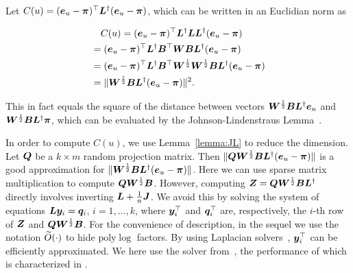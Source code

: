 \documentclass[journal]{IEEEtran}
\begin{document}
Let \(C(u)=(\boldsymbol{e}_u - \boldsymbol{\pi})^{\top} \boldsymbol{L}^{\dagger} (\boldsymbol{e}_u- \boldsymbol{\pi})\), which can be written in an Euclidian norm as
\begin{small}
    \begin{equation}\label{EE12}
        \begin{split}
            &\quad C(u)=(\boldsymbol{e}_u - \boldsymbol{\pi})^{\top} \boldsymbol{L}^{\dagger} \boldsymbol{L} \boldsymbol{L}^{\dagger} (\boldsymbol{e}_u - \boldsymbol{\pi}) \\
            &=(\boldsymbol{e}_u - \boldsymbol{\pi})^{\top} \boldsymbol{L}^{\dagger} \boldsymbol{B}^{\top} \boldsymbol{W} \boldsymbol{B} \boldsymbol{L}^{\dagger} (\boldsymbol{e}_u - \boldsymbol{\pi}) \\
            &=(\boldsymbol{e}_u - \boldsymbol{\pi})^{\top} \boldsymbol{L}^{\dagger} \boldsymbol{B}^{\top} \boldsymbol{W}^{\frac{1}{2}} \boldsymbol{W}^{\frac{1}{2}} \boldsymbol{B} \boldsymbol{L}^{\dagger} (\boldsymbol{e}_u - \boldsymbol{\pi}) \\
            &=\|\boldsymbol{W}^{\frac{1}{2}} \boldsymbol{B} \boldsymbol{L}^{\dagger} (\boldsymbol{e}_u - \boldsymbol{\pi})\|^2.
        \end{split}
    \end{equation}
\end{small}
This  in fact  equals the square of the distance between  vectors  \(\boldsymbol{W}^{\frac{1}{2}} \boldsymbol{B} \boldsymbol{L}^{\dagger} \boldsymbol{e}_u\) and \(\boldsymbol{W}^{\frac{1}{2}} \boldsymbol{B} \boldsymbol{L}^{\dagger} \boldsymbol{\pi}\), which can be evaluated by the Johnson-Lindenstraus
Lemma~\cite{Ac01}.

In order to compute  \(C(u)\), we use Lemma~\ref{lemma:JL} to reduce the dimension. Let \(\boldsymbol{Q}\) be a \(k\times m\) random projection matrix. Then  \(\|\boldsymbol{Q} \boldsymbol{W}^{\frac{1}{2}} \boldsymbol{B} \boldsymbol{L}^{\dagger}(\boldsymbol{e}_u-\boldsymbol{\pi})\|\) is a good approximation for \(\|\boldsymbol{W}^{\frac{1}{2}} \boldsymbol{B} \boldsymbol{L}^{\dagger} (\boldsymbol{e}_u - \boldsymbol{\pi})\|\). Here we can use sparse matrix multiplication to compute \(\boldsymbol{Q} \boldsymbol{W}^{\frac{1}{2}} \boldsymbol{B}\). However, computing \(\boldsymbol{Z}=\boldsymbol{Q} \boldsymbol{W}^{\frac{1}{2}} \boldsymbol{B} \boldsymbol{L}^{\dagger}\) directly involves inverting \(\boldsymbol{L}+\frac{1}{n}\boldsymbol{J}\). We avoid this by solving the system of equations \(\boldsymbol{L} \boldsymbol{y}_i=\boldsymbol{q}_i\), \(i=1,\ldots,k\), where  \(\boldsymbol{y}^\top_i\) and \(\boldsymbol{q}^\top_i\) are, respectively, the \(i\)-th row of \(\boldsymbol{Z}\) and \(\boldsymbol{Q} \boldsymbol{W}^{\frac{1}{2}} \boldsymbol{B}\). For the convenience  of description, in the sequel we use the notation \(\widetilde{O}(\cdot)\) to hide \(\mathrm{poly} \log \) factors. By using Laplacian solvers~\cite{SpTe04,Sp10,KoMiPe11,LiBr12,CoKyMiPaPeRaSu14,KySa16}, \(\boldsymbol{y}^\top _i\) can be efficiently approximated.  We here use the  solver from~\cite{CoKyMiPaPeRaSu14}, the performance of which is characterized in .
\end{document}
